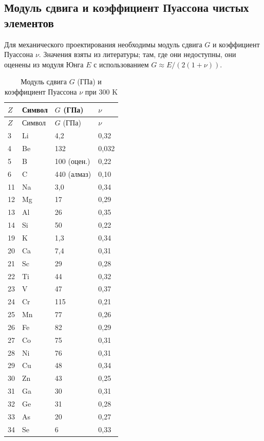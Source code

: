 \documentclass[12pt,a4paper]{article}
\begin{document}
	\subsection{Модуль сдвига и коэффициент Пуассона чистых элементов}
	\label{subsec:elastic-constants}
	
	Для механического проектирования необходимы модуль сдвига \(G\) и коэффициент Пуассона \(\nu\). Значения взяты из литературы; там, где они недоступны, они оценены из модуля Юнга \(E\) с использованием \(G \approx E/(2(1+\nu))\).
	
	\begin{longtable}{p{0.6cm}p{1.2cm}p{1.5cm}p{1.5cm}}
		\caption{Модуль сдвига \(G\) (ГПа) и коэффициент Пуассона \(\nu\) при 300 K} \label{tab:elastic-constants-all} \\
		\toprule
		\(Z\) & Символ & \(G\) (ГПа) & \(\nu\) \\
		\midrule
		\endfirsthead
		\toprule
		\(Z\) & Символ & \(G\) (ГПа) & \(\nu\) \\
		\midrule
		\endhead
		3  & Li & 4,2 & 0,32 \\
		4  & Be & 132 & 0,032 \\
		5  & B  & 100 (оцен.) & 0,22 \\
		6  & C  & 440 (алмаз) & 0,10 \\
		11 & Na & 3,0 & 0,34 \\
		12 & Mg & 17 & 0,29 \\
		13 & Al & 26 & 0,35 \\
		14 & Si & 50 & 0,22 \\
		19 & K  & 1,3 & 0,34 \\
		20 & Ca & 7,4 & 0,31 \\
		21 & Sc & 29 & 0,28 \\
		22 & Ti & 44 & 0,32 \\
		23 & V  & 47 & 0,37 \\
		24 & Cr & 115 & 0,21 \\
		25 & Mn & 77 & 0,26 \\
		26 & Fe & 82 & 0,29 \\
		27 & Co & 75 & 0,31 \\
		28 & Ni & 76 & 0,31 \\
		29 & Cu & 48 & 0,34 \\
		30 & Zn & 43 & 0,25 \\
		31 & Ga & 30 & 0,31 \\
		32 & Ge & 31 & 0,28 \\
		33 & As & 20 & 0,27 \\
		34 & Se & 6 & 0,33 \\

\end{longtable}
\end{document}

